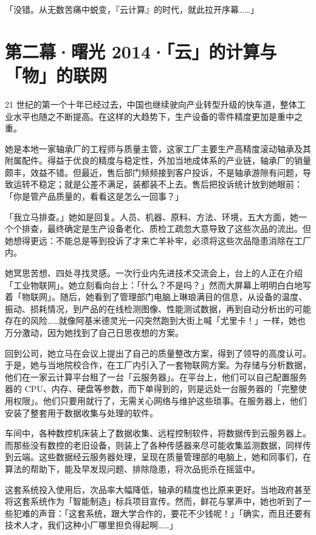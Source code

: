「没错。从无数苦痛中蜕变，『云计算』的时代，就此拉开序幕……」

\section{第二幕·曙光 2014·「云」的计算与「物」的联网}

21 世纪的第一个十年已经过去，中国也继续驶向产业转型升级的快车道，整体工业水平也随之不断提高。在这样的大趋势下，生产设备的零件精度更加是重中之重。

她是本地一家轴承厂的工程师与质量主管，这家工厂主要生产高精度滚动轴承及其附属配件。得益于优良的精度与稳定性，外加当地成体系的产业链，轴承厂的销量颇丰，效益不错。但最近，售后部门频频接到客户投诉，不是轴承游隙有问题，导致运转不稳定；就是公差不满足，装都装不上去。售后把投诉统计放到她眼前：「你是管产品质量的，看看这是怎么一回事？」

「我立马排查。」她如是回复。人员、机器、原料、方法、环境，五大方面，她一个个排查，最终确定是生产设备老化、质检工疏忽大意导致了这些次品的流出。但她想得更远：不能总是等到投诉了才来亡羊补牢，必须将这些次品隐患消除在工厂内。

她冥思苦想、四处寻找灵感。一次行业内先进技术交流会上，台上的人正在介绍「工业物联网」。她立刻看向台上：「什么？不是吗？」然而大屏幕上明明白白地写着「物联网」。随后，她看到了管理部门电脑上琳琅满目的信息，从设备的温度、振动、损耗情况，到产品的在线检测图像、性能测试数据，再到自动分析出的可能存在的风险……就像阿基米德灵光一闪突然跑到大街上喊「尤里卡！」一样，她也万分激动，因为她找到了自己日思夜想的方案。

回到公司，她立马在会议上提出了自己的质量整改方案，得到了领导的高度认可。于是，她与当地院校合作，在工厂内引入了一套物联网方案。为存储与分析数据，他们在一家云计算平台租了一台「云服务器」。在平台上，他们可以自己配置服务器的 CPU、内存、硬盘等参数，而下单得到的，则是远处一台服务器的「完整使用权限」。他们只要用就行了，无需关心网络与维护这些琐事。在服务器上，他们安装了整套用于数据收集与处理的软件。

车间中，各种数控机床装上了数据收集、远程控制软件，将数据传到云服务器上。而那些没有数控的老旧设备，则装上了各种传感器来尽可能收集监测数据，同样传到云端。这些数据经云服务器处理，呈现在质量管理部的电脑上，她和同事们，在算法的帮助下，能及早发现问题、排除隐患，将次品扼杀在摇篮中。

这套系统投入使用后，次品率大幅降低，轴承的精度也比原来更好。当地政府甚至将这套系统作为「智能制造」标兵项目宣传。然而，鲜花与掌声中，她也听到了一些犯难的声音：「这套系统，跟大学合作的，要花不少钱呢！」「确实，而且还要有技术人才，我们这种小厂哪里担负得起啊……」

